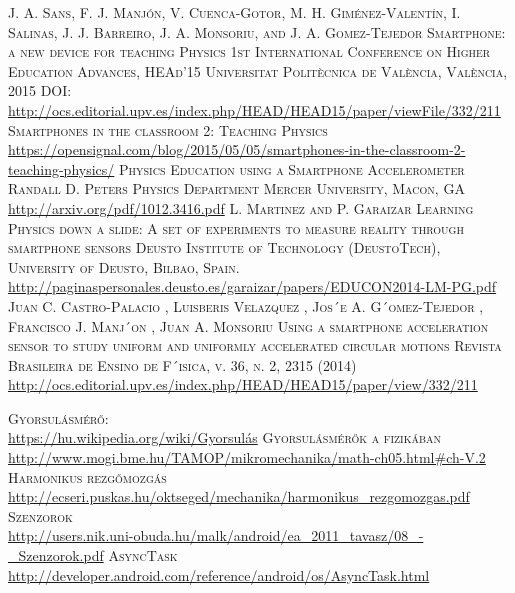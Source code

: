 \documentclass{thesis-ekf}
\theoremstyle{definition}
\theoremstyle{remark}
\begin{document}
\begin{thebibliography}{1}
 \textsc{J. A. Sans, F. J. Manjón, V. Cuenca-Gotor, M. H. Giménez-Valentín, I. Salinas, J. J. Barreiro, J. A. Monsoriu, and J. A. Gomez-Tejedor  Smartphone: a new device for teaching Physics  1st International Conference on Higher Education Advances, HEAd’15 Universitat Politècnica de València, València, 2015 DOI: }
\url{http://ocs.editorial.upv.es/index.php/HEAD/HEAD15/paper/viewFile/332/211}
 \textsc{Smartphones in the classroom 2: Teaching Physics }\\
\url{https://opensignal.com/blog/2015/05/05/smartphones-in-the-classroom-2-teaching-physics/}
 \textsc{Physics Education using a Smartphone Accelerometer Randall D. Peters Physics Department Mercer University, Macon, GA  }\\
\url{http://arxiv.org/pdf/1012.3416.pdf}
 \textsc{L. Martinez and P. Garaizar  Learning Physics down a slide: A set of experiments to measure reality through smartphone sensors Deusto Institute of Technology (DeustoTech), University of Deusto, Bilbao, Spain. }\\
\url{http://paginaspersonales.deusto.es/garaizar/papers/EDUCON2014-LM-PG.pdf}
 \textsc{Juan C. Castro-Palacio , Luisberis Velazquez , Jos´e A. G´omez-Tejedor , Francisco J. Manj´on , Juan A. Monsoriu Using a smartphone acceleration sensor to study uniform and uniformly accelerated circular motions 
	Revista Brasileira de Ensino de F´ısica, v. 36, n. 2, 2315 (2014)}\\
\url{http://ocs.editorial.upv.es/index.php/HEAD/HEAD15/paper/view/332/211}

 \textsc{Gyorsulásmérő}:\\\url{https://hu.wikipedia.org/wiki/Gyorsulás}
 \textsc{Gyorsulásmérők a fizikában}\\ \url{http://www.mogi.bme.hu/TAMOP/mikromechanika/math-ch05.html#ch-V.2}
 \textsc{Harmonikus rezgőmozgás}\\
\url{http://ecseri.puskas.hu/oktseged/mechanika/harmonikus_rezgomozgas.pdf}
 \textsc{Szenzorok}\\
\url{http://users.nik.uni-obuda.hu/malk/android/ea_2011_tavasz/08_-_Szenzorok.pdf}
 \textsc{AsyncTask}\\
\url{http://developer.android.com/reference/android/os/AsyncTask.html}





\end{thebibliography}
\end{document}
